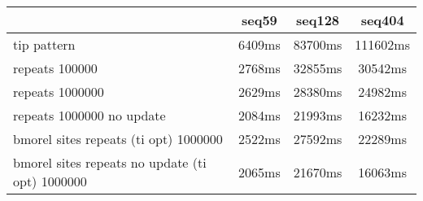 \begin{tabular}{|l|c|c|c|}
\hline
 & seq59 & seq128 & seq404  \\
\hline
tip pattern & 6409ms & 83700ms & 111602ms\\
\hline
repeats 100000 & 2768ms & 32855ms & 30542ms\\
\hline
repeats 1000000 & 2629ms & 28380ms & 24982ms\\
\hline
repeats 1000000 no update & 2084ms & 21993ms & 16232ms\\
\hline
bmorel sites repeats (ti opt) 1000000 & 2522ms & 27592ms & 22289ms\\
\hline
bmorel sites repeats no update (ti opt) 1000000 & 2065ms & 21670ms & 16063ms\\
\hline
\end{tabular}
